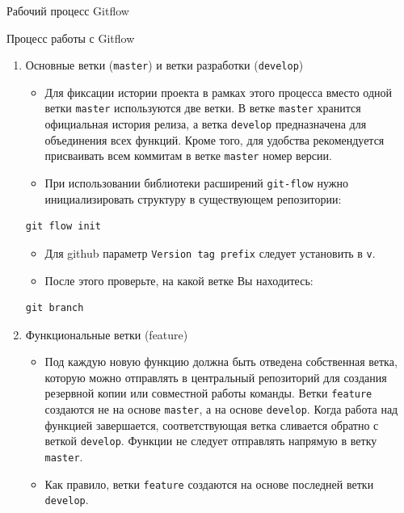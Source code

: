 \documentclass[
  ignorenonframetext,
  aspectratio=169,
  russian,
]{beamer}
\providecommand{\tightlist}{%
  \setlength{\itemsep}{0pt}\setlength{\parskip}{0pt}}
\begin{document}
\begin{frame}[fragile]{Рабочий процесс Gitflow}
\begin{block}{Процесс работы с Gitflow}
\protect{}\label{ux43fux440ux43eux446ux435ux441ux441-ux440ux430ux431ux43eux442ux44b-ux441-gitflow}
\begin{enumerate}[<+->]
\item
  Основные ветки (\texttt{master}) и ветки разработки (\texttt{develop})

  \begin{itemize}[<+->]
  \tightlist
  \item
    Для фиксации истории проекта в рамках этого процесса вместо одной
    ветки \texttt{master} используются две ветки. В ветке
    \texttt{master} хранится официальная история релиза, а ветка
    \texttt{develop} предназначена для объединения всех функций. Кроме
    того, для удобства рекомендуется присваивать всем коммитам в ветке
    \texttt{master} номер версии.
  \item
    При использовании библиотеки расширений \texttt{git-flow} нужно
    инициализировать структуру в существующем репозитории:
  \end{itemize}

\begin{verbatim}
git flow init
\end{verbatim}

  \begin{itemize}[<+->]
  \tightlist
  \item
    Для github параметр \texttt{Version\ tag\ prefix} следует установить
    в \texttt{v}.
  \item
    После этого проверьте, на какой ветке Вы находитесь:
  \end{itemize}

\begin{verbatim}
git branch
\end{verbatim}
\item
  Функциональные ветки (feature)

  \begin{itemize}[<+->]
  \tightlist
  \item
    Под каждую новую функцию должна быть отведена собственная ветка,
    которую можно отправлять в центральный репозиторий для создания
    резервной копии или совместной работы команды. Ветки
    \texttt{feature} создаются не на основе \texttt{master}, а на основе
    \texttt{develop}. Когда работа над функцией завершается,
    соответствующая ветка сливается обратно с веткой \texttt{develop}.
    Функции не следует отправлять напрямую в ветку \texttt{master}.
  \item
    Как правило, ветки \texttt{feature} создаются на основе последней
    ветки \texttt{develop}.


\end{itemize}
\end{enumerate}
\end{block}
\end{frame}
\end{document}
